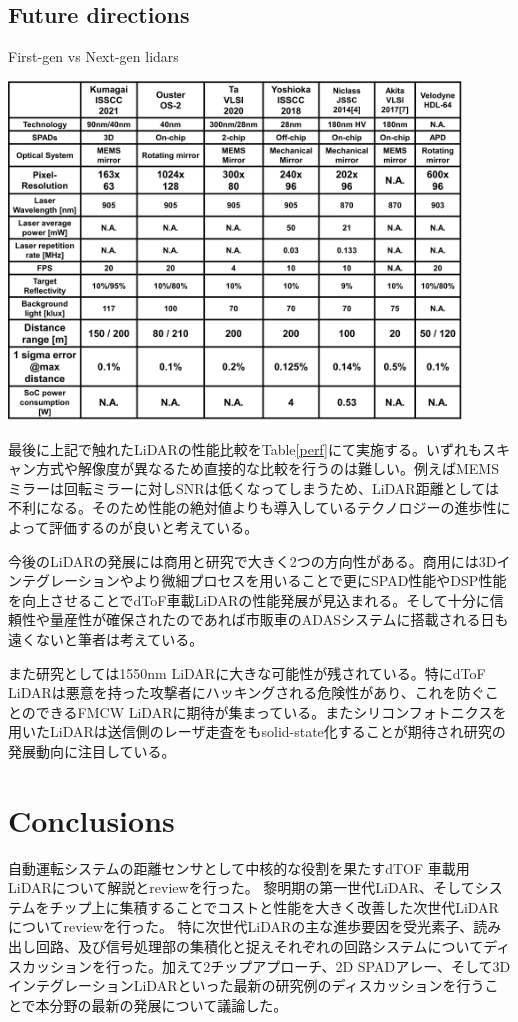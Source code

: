 \documentclass[letterpaper, 10 pt, conference]{ieeeconf}  %
\begin{document}
\subsection{Future directions}
\begin{table}[!t]
\centering
\caption{First-gen vs Next-gen lidars}
 \includegraphics[width=0.9\textwidth]{figs/performance.png}
\label{perf}
\end{table}
最後に上記で触れたLiDARの性能比較をTable\ref{perf}にて実施する。いずれもスキャン方式や解像度が異なるため直接的な比較を行うのは難しい。例えばMEMSミラーは回転ミラーに対しSNRは低くなってしまうため、LiDAR距離としては不利になる。そのため性能の絶対値よりも導入しているテクノロジーの進歩性によって評価するのが良いと考えている。

今後のLiDARの発展には商用と研究で大きく2つの方向性がある。商用には3Dインテグレーションやより微細プロセスを用いることで更にSPAD性能やDSP性能を向上させることでdToF車載LiDARの性能発展が見込まれる。そして十分に信頼性や量産性が確保されたのであれば市販車のADASシステムに搭載される日も遠くないと筆者は考えている。

また研究としては1550nm LiDARに大きな可能性が残されている。特にdToF LiDARは悪意を持った攻撃者にハッキングされる危険性があり\cite{sun2020towards, cao2019adversarial}、これを防ぐことのできるFMCW LiDARに期待が集まっている\cite{aptivpatent}。またシリコンフォトニクスを用いたLiDARは送信側のレーザ走査をもsolid-state化することが期待され研究の発展動向に注目している\cite{poulton2017coherent,chung202119}。

\section{Conclusions}
自動運転システムの距離センサとして中核的な役割を果たすdTOF 車載用LiDARについて解説とreviewを行った。
黎明期の第一世代LiDAR、そしてシステムをチップ上に集積することでコストと性能を大きく改善した次世代LiDARについてreviewを行った。
特に次世代LiDARの主な進歩要因を受光素子、読み出し回路、及び信号処理部の集積化と捉えそれぞれの回路システムについてディスカッションを行った。加えて2チップアプローチ、2D SPADアレー、そして3DインテグレーションLiDARといった最新の研究例のディスカッションを行うことで本分野の最新の発展について議論した。
\end{document}
